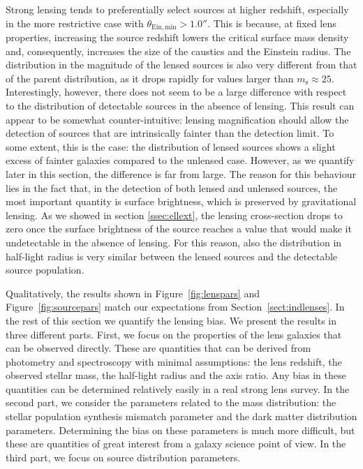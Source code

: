 \documentclass{aa}
\def\msource{m_{\mathrm{s}}}
\def\Sref#1{Section~\ref{#1}\xspace}
\def\Fref#1{Figure~\ref{#1}\xspace}
\begin{document}
Strong lensing tends to preferentially select sources at higher redshift, especially in the more restrictive case with $\theta_{\mathrm{Ein,min}} > 1.0''$.
This is because, at fixed lens properties, increasing the source redshift lowers the critical surface mass density and, consequently, increases the size of the caustics and the Einstein radius.
The distribution in the magnitude of the lensed sources is also very different from that of the parent distribution, as it drops rapidly for values larger than $\msource\approx25$.
Interestingly, however, there does not seem to be a large difference with respect to the distribution of detectable sources in the absence of lensing.
This result can appear to be somewhat counter-intuitive: lensing magnification should allow the detection of sources that are intrinsically fainter than the detection limit. To some extent, this is the case: the distribution of lensed sources shows a slight excess of fainter galaxies compared to the unlensed case. However, as we quantify later in this section, the difference is far from large.
The reason for this behaviour lies in the fact that, in the detection of both lensed and unlensed sources, the most important quantity is surface brightness, which is preserved by gravitational lensing.
As we showed in section \ref{ssec:ellext}, the lensing cross-section drops to zero once the surface brightness of the source reaches a value that would make it undetectable in the absence of lensing.
For this reason, also the distribution in half-light radius is very similar between the lensed sources and the detectable source population.


Qualitatively, the results shown in \Fref{fig:lenspars} and \Fref{fig:sourcepars} match our expectations from \Sref{sect:indlenses}.
In the rest of this section we quantify the lensing bias.
We present the results in three different parts.
First, we focus on the properties of the lens galaxies that can be observed directly. These are quantities that can be derived from photometry and spectroscopy with minimal assumptions: the lens redshift, the observed stellar mass, the half-light radius and the axis ratio.
Any bias in these quantities can be determined relatively easily in a real strong lens survey.
In the second part, we consider the parameters related to the mass distribution: the stellar population synthesis mismatch parameter and the dark matter distribution parameters. Determining the bias on these parameters is much more difficult, but these are quantities of great interest from a galaxy science point of view.
In the third part, we focus on source distribution parameters. 
\end{document}
